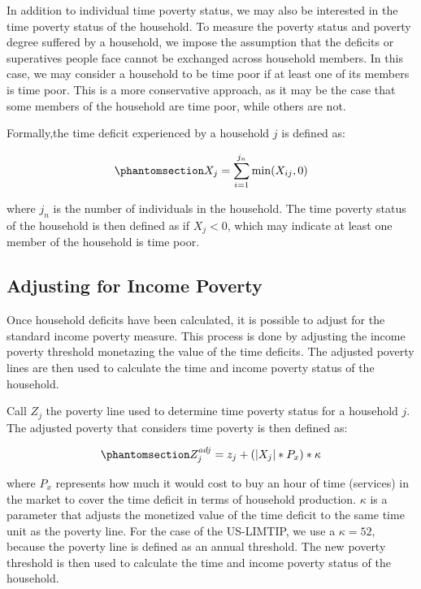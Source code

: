 \documentclass[
  11pt,
]{article}
\begin{document}
In addition to individual time poverty status, we may also be interested
in the time poverty status of the household. To measure the poverty
status and poverty degree suffered by a household, we impose the
assumption that the deficits or superatives people face cannot be
exchanged across household members. In this case, we may consider a
household to be time poor if at least one of its members is time poor.
This is a more conservative approach, as it may be the case that some
members of the household are time poor, while others are not.

Formally,the time deficit experienced by a household \(j\) is defined
as:

\begin{equation}\phantomsection\label{eq-hhdef}{X_j = \sum_{i=1}^{j_n} \min(X_{ij},0)
}\end{equation}

where \(j_n\) is the number of individuals in the household. The time
poverty status of the household is then defined as if \(X_j < 0\), which
may indicate at least one member of the household is time poor.

\subsection{Adjusting for Income
Poverty}\label{adjusting-for-income-poverty}

Once household deficits have been calculated, it is possible to adjust
for the standard income poverty measure. This process is done by
adjusting the income poverty threshold monetazing the value of the time
deficits. The adjusted poverty lines are then used to calculate the time
and income poverty status of the household.

Call \(Z_j\) the poverty line used to determine time poverty status for
a household \(j\). The adjusted poverty that considers time poverty is
then defined as:

\begin{equation}\phantomsection\label{eq-adjpline}{Z_j^{adj} = z_j + (|X_j| * P_x)*\kappa
}\end{equation}

where \(P_x\) represents how much it would cost to buy an hour of time
(services) in the market to cover the time deficit in terms of household
production. \(\kappa\) is a parameter that adjusts the monetized value
of the time deficit to the same time unit as the poverty line. For the
case of the US-LIMTIP, we use a \(\kappa=52\), because the poverty line
is defined as an annual threshold. The new poverty threshold is then
used to calculate the time and income poverty status of the household.
\end{document}
